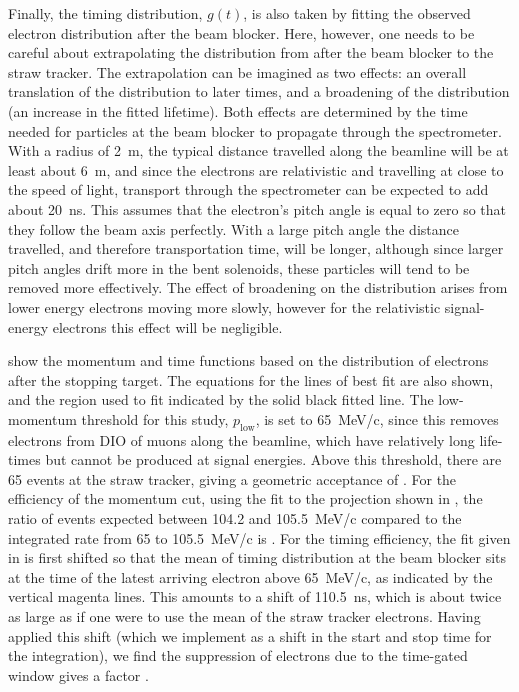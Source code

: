 Finally, the timing distribution, $g(t)$, is also taken by fitting the observed electron distribution after the beam blocker.
Here, however, one needs to be careful about extrapolating the distribution from after the beam blocker to the straw tracker.
The extrapolation can be imagined as two effects: an overall translation of the distribution to later times, and a broadening of the distribution (an increase in the fitted lifetime).
Both effects are determined by the time needed for particles at the beam blocker to propagate through the spectrometer.
With a radius of 2~m, the typical distance travelled along the beamline will be at least about 6~m, and since the electrons are relativistic and travelling at close to the speed of light, transport through the spectrometer can be expected to add about 20~ns.
This assumes that the electron's pitch angle is equal to zero so that they follow the beam axis perfectly.
With a large pitch angle the distance travelled, and therefore transportation time, will be longer, although since larger pitch angles drift more in the bent solenoids, these particles will tend to be removed more effectively.
The effect of broadening on the distribution arises from lower energy electrons moving more slowly, however for the relativistic signal-energy electrons this effect will be negligible.

 show the momentum and time functions based on the distribution of electrons after the stopping target.
The equations for the lines of best fit are also shown, and the region used to fit indicated by the solid black fitted line.
The low-momentum threshold for this study, $p_\textrm{low}$, is set to 65~MeV/c, since this removes electrons from \ac{DIO} of muons along the beamline, which have relatively long life-times but cannot be produced at signal energies.
Above this threshold, there are 65 events at the straw tracker, giving a geometric acceptance of \VarBeamBgGeometric.
For the efficiency of the momentum cut, using the fit to the projection shown in , the ratio of events expected between 104.2 and 105.5~MeV/c compared to the integrated rate from 65 to 105.5~MeV/c is \VarBeamBgMomentum.
For the timing efficiency, the fit given in  is first shifted so that the mean of timing distribution at the beam blocker sits at the time of the latest arriving electron above 65~MeV/c, as indicated
by the vertical magenta lines. 
This amounts to a shift of 110.5~ns, which is about twice as large as if one were to use the mean of the straw tracker electrons.
Having applied this shift (which we implement as a shift in the start and stop time for the integration), we find the suppression of electrons due to the time-gated window gives a factor \VarBeamBgTiming.

